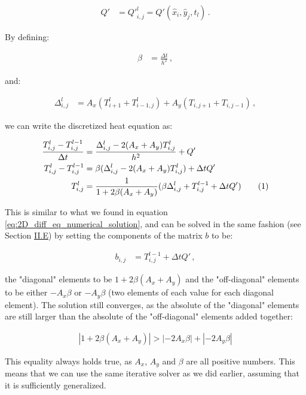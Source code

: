 \documentclass[reprint,english,notitlepage]{revtex4-1}  %
\newcommand\numberthis{\addtocounter{equation}{1}\tag{\theequation}}
\begin{document}
\begin{align*}
Q' &= {Q'}_{i,j}^l = Q'(\hat{x}_i,\hat{y}_j,t_l) \, .
\end{align*} 

By defining:

\begin{align*}
\beta &= \frac{\Delta t}{h^2} \, ,
\end{align*}

and:

\begin{align*}
\Delta_{i,j}^l &= A_x(T_{i+1}^l + T_{i-1,j}^l) + A_y(T_{i,j+1} + T_{i,j-1}) \, ,
\end{align*}

we can write the discretized heat equation as:

\begin{align*}
\frac{T_{i,j}^l - T_{i,j}^{l-1}}{\Delta t} &= \frac{\Delta_{i,j}^l - 2(A_x+A_y)T_{i,j}^l}{h^2} + Q' \\
T_{i,j}^l - T_{i,j}^{l-1} &= \beta (\Delta_{i,j}^l - 2(A_x+A_y)T_{i,j}^l) + \Delta t Q' \\
T_{i,j}^l &= \frac{1}{1 + 2\beta (A_x+A_y) } (\beta \Delta_{i,j}^l + T_{i,j}^{l-1} + \Delta t Q') \numberthis \label{eq:heat_eq_with_source_term_numerical_solution}
\end{align*}

This is similar to what we found in equation \eqref{eq:2D_diff_eq_numerical_solution}, and can be solved in the same fashion (see Section \hyperref[sec:formalism_2D_diff_eq_numerical]{II.E}) by setting the components of the matrix $b$ to be:

\begin{align*}
b_{i,j} &= T_{i,j}^{l-1} + \Delta t Q' \, ,
\end{align*} 

the "diagonal" elements to be $1 + 2\beta(A_x+A_y)$ and the "off-diagonal" elements to be either $-A_x\beta$ or $-A_y\beta $ (two elements of each value for each diagonal element). The solution still converges, as the absolute of the "diagonal" elements are still larger than the absolute of the "off-diagonal" elements added together:

\begin{align*}
|1 + 2\beta(A_x + A_y)| > |-2A_x \beta| + |-2A_y \beta |
\end{align*}

This equality always holds true, as $A_x$, $A_y$ and $\beta$ are all positive numbers. This means that we can use the same iterative solver as we did earlier, assuming that it is sufficiently generalized.
\end{document}
